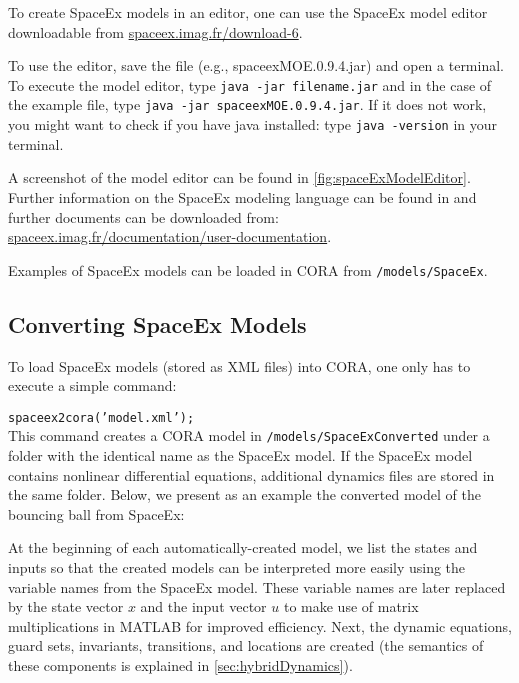 To create SpaceEx models in an editor, one can use the SpaceEx model editor downloadable from \href{http://spaceex.imag.fr/download-6}{spaceex.imag.fr/download-6}. 

To use the editor, save the file (e.g., spaceexMOE.0.9.4.jar) and open a terminal. To execute the model editor, type \texttt{java -jar filename.jar} and in the case of the example file, type \texttt{java -jar spaceexMOE.0.9.4.jar}. If it does not work, you might want to check if you have java installed: type \texttt{java -version} in your terminal.

A screenshot of the model editor can be found in \cref{fig:spaceExModelEditor}. Further information on the SpaceEx modeling language can be found in \cite{Donze2013} and further documents can be downloaded from: \\ \href{http://spaceex.imag.fr/documentation/user-documentation}{spaceex.imag.fr/documentation/user-documentation}.

Examples of SpaceEx models can be loaded in CORA from \texttt{/models/SpaceEx}. 

\subsection{Converting SpaceEx Models} \label{sec:convertingSpaceExModels}

To load SpaceEx models (stored as XML files) into CORA, one only has to execute a simple command:

\texttt{spaceex2cora('model.xml');} \\

This command creates a CORA model in \texttt{/models/SpaceExConverted} under a folder with the identical name as the SpaceEx model. If the SpaceEx model contains nonlinear differential equations, additional dynamics files are stored in the same folder. Below, we present as an example the converted model of the bouncing ball from SpaceEx:

\newpage
{\footnotesize
}

At the beginning of each automatically-created model, we list the states and inputs so that the created models can be interpreted more easily using the variable names from the SpaceEx model. These variable names are later replaced by the state vector $x$ and the input vector $u$ to make use of matrix multiplications in MATLAB for improved efficiency. Next, the dynamic equations, guard sets, invariants, transitions, and locations are created (the semantics of these components is explained in \cref{sec:hybridDynamics}).

